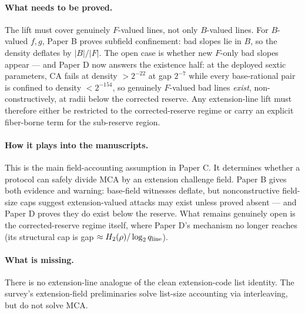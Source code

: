\documentclass[11pt]{article}
\theoremstyle{definition}
\theoremstyle{remark}
\newcommand{\qline}{q_{\rm line}}
\newcommand{\paperB}{Paper B}
\newcommand{\paperC}{Paper C}
\newcommand{\paperD}{Paper D}
\begin{document}
\paragraph{What needs to be proved.}  The lift must cover genuinely $F$-valued lines, not only $B$-valued lines.  For $B$-valued $f,g$, \paperB{} proves subfield confinement: bad slopes lie in $B$, so the density deflates by $|B|/|F|$.  The open case is whether new $F$-only bad slopes appear --- and \paperD{} now answers the existence half: at the deployed sextic parameters, CA fails at density $>2^{-22}$ at gap $2^{-7}$ while every base-rational pair is confined to density $<2^{-154}$, so genuinely $F$-valued bad lines \emph{exist}, non-constructively, at radii below the corrected reserve.  Any extension-line lift must therefore either be restricted to the corrected-reserve regime or carry an explicit fiber-borne term for the sub-reserve region.

\paragraph{How it plays into the manuscripts.}  This is the main field-accounting assumption in \paperC.  It determines whether a protocol can safely divide MCA by an extension challenge field.  \paperB{} gives both evidence and warning: base-field witnesses deflate, but nonconstructive field-size caps suggest extension-valued attacks may exist unless proved absent --- and \paperD{} proves they do exist below the reserve.  What remains genuinely open is the corrected-reserve regime itself, where \paperD's mechanism no longer reaches (its structural cap is gap $\approx H_2(\rho)/\log_2\qline$).

\paragraph{What is missing.}  There is no extension-line analogue of the clean extension-code list identity.  The survey's extension-field preliminaries solve list-size accounting via interleaving, but do not solve MCA.
\end{document}

